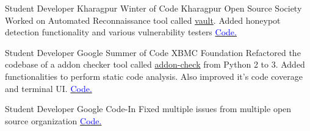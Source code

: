     {Student Developer}
    {Kharagpur Winter of Code}
    {Kharagpur Open Source Society}
    {}
    {
        Worked on Automated Reconnaissance tool called \href{https://github.com/abhisharma404/vault}{vault}. Added honeypot detection functionality and various vulnerability testers
        \hfill
        \href{https://github.com/abhisharma404/vault/commits?author=mzfr}{\textcolor{blue}{\scriptsize Code.}}
    }
    \vspace*{0.2\baselineskip}

    {Student Developer}
    {Google Summer of Code}
    {XBMC Foundation}
    {}
    {
        Refactored the codebase of a addon checker tool called \href{https://github.com/xbmc/addon-check/}{addon-check} from Python 2 to 3. Added functionalities to perform static code analysis. Also improved  it's code coverage and terminal UI.
        \hfill
        \href{https://github.com/xbmc/addon-check/commits?author=mzfr}{\textcolor{blue}{\scriptsize Code.}}
    }
    \vspace*{0.2\baselineskip}

    {Student Developer}
    {Google Code-In}
    {}
    {
        Fixed multiple issues from multiple open source organization
        \hfill
        \href{https://codein.withgoogle.com/archive/search/?q=mehtab%20zafar}{\textcolor{blue}{\scriptsize Code.}}
    }
    \vspace*{0.2\baselineskip}
